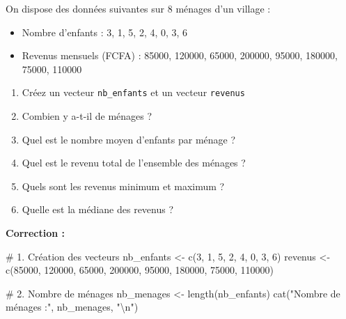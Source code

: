 \documentclass[
  french,
  11pt,
  a4paper,
]{article}
\newenvironment{Shaded}{}{}
\newcommand{\CommentTok}[1]{\textcolor[rgb]{0.42,0.45,0.49}{#1}}
\newcommand{\DecValTok}[1]{\textcolor[rgb]{0.00,0.36,0.77}{#1}}
\newcommand{\FunctionTok}[1]{\textcolor[rgb]{0.44,0.26,0.76}{#1}}
\newcommand{\NormalTok}[1]{\textcolor[rgb]{0.14,0.16,0.18}{#1}}
\newcommand{\OtherTok}[1]{\textcolor[rgb]{0.44,0.26,0.76}{#1}}
\newcommand{\SpecialCharTok}[1]{\textcolor[rgb]{0.00,0.36,0.77}{#1}}
\newcommand{\StringTok}[1]{\textcolor[rgb]{0.01,0.18,0.38}{#1}}
\providecommand{\tightlist}{%
  \setlength{\itemsep}{0pt}\setlength{\parskip}{0pt}}
\begin{document}
\begin{tcolorbox}[enhanced jigsaw, arc=.35mm, bottomrule=.15mm, bottomtitle=1mm, breakable, colback=white, colbacktitle=quarto-callout-caution-color!10!white, colframe=quarto-callout-caution-color-frame, coltitle=black, left=2mm, leftrule=.75mm, opacityback=0, opacitybacktitle=0.6, rightrule=.15mm, title=\textcolor{quarto-callout-caution-color}{\faFire}\hspace{0.5em}{Exercice 4 --- Manipulation de vecteurs}, titlerule=0mm, toprule=.15mm, toptitle=1mm]

On dispose des données suivantes sur 8 ménages d'un village :

\begin{itemize}
\tightlist
\item
  Nombre d'enfants : 3, 1, 5, 2, 4, 0, 3, 6
\item
  Revenus mensuels (FCFA) : 85000, 120000, 65000, 200000, 95000, 180000,
  75000, 110000
\end{itemize}

\begin{enumerate}
\def\labelenumi{\arabic{enumi}.}
\tightlist
\item
  Créez un vecteur \texttt{nb\_enfants} et un vecteur \texttt{revenus}
\item
  Combien y a-t-il de ménages ?
\item
  Quel est le nombre moyen d'enfants par ménage ?
\item
  Quel est le revenu total de l'ensemble des ménages ?
\item
  Quels sont les revenus minimum et maximum ?
\item
  Quelle est la médiane des revenus ?
\end{enumerate}

\end{tcolorbox}

\textbf{Correction :}

\begin{Shaded}
\begin{Highlighting}[]
\CommentTok{\# 1. Création des vecteurs}
\NormalTok{nb\_enfants }\OtherTok{\textless{}{-}} \FunctionTok{c}\NormalTok{(}\DecValTok{3}\NormalTok{, }\DecValTok{1}\NormalTok{, }\DecValTok{5}\NormalTok{, }\DecValTok{2}\NormalTok{, }\DecValTok{4}\NormalTok{, }\DecValTok{0}\NormalTok{, }\DecValTok{3}\NormalTok{, }\DecValTok{6}\NormalTok{)}
\NormalTok{revenus }\OtherTok{\textless{}{-}} \FunctionTok{c}\NormalTok{(}\DecValTok{85000}\NormalTok{, }\DecValTok{120000}\NormalTok{, }\DecValTok{65000}\NormalTok{, }\DecValTok{200000}\NormalTok{, }\DecValTok{95000}\NormalTok{, }\DecValTok{180000}\NormalTok{, }\DecValTok{75000}\NormalTok{, }\DecValTok{110000}\NormalTok{)}

\CommentTok{\# 2. Nombre de ménages}
\NormalTok{nb\_menages }\OtherTok{\textless{}{-}} \FunctionTok{length}\NormalTok{(nb\_enfants)}
\FunctionTok{cat}\NormalTok{(}\StringTok{"Nombre de ménages :"}\NormalTok{, nb\_menages, }\StringTok{"}\SpecialCharTok{\textbackslash{}n}\StringTok{"}\NormalTok{)}
\end{Highlighting}
\end{Shaded}
\end{document}
